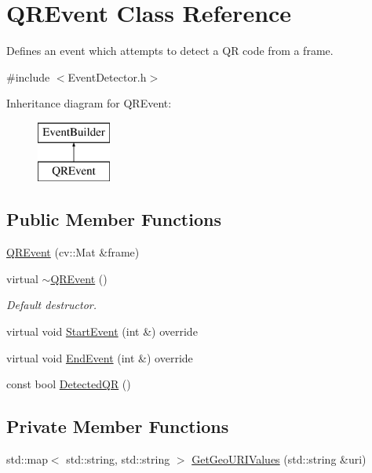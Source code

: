 \hypertarget{class_q_r_event}{}\section{Q\+R\+Event Class Reference}
\label{class_q_r_event}


Defines an event which attempts to detect a QR code from a frame.  




{\ttfamily \#include $<$Event\+Detector.\+h$>$}

Inheritance diagram for Q\+R\+Event\+:\begin{figure}[H]
\begin{center}
\leavevmode
\includegraphics[height=2.000000cm]{class_q_r_event}
\end{center}
\end{figure}
\subsection*{Public Member Functions}
\begin{DoxyCompactItemize}
\item 
\mbox{\hyperlink{class_q_r_event_aacf861110c0a1c3543dee2a6a6aefad1}{Q\+R\+Event}} (cv\+::\+Mat \&frame)
\item 
\mbox{\label{class_q_r_event_a930848ca7d5e1ff15e75abeca5cc90da}} 
virtual \mbox{\hyperlink{class_q_r_event_a930848ca7d5e1ff15e75abeca5cc90da}{$\sim$\+Q\+R\+Event}} ()
\begin{DoxyCompactList}\small\item\em Default destructor. \end{DoxyCompactList}\item 
virtual void \mbox{\hyperlink{class_q_r_event_a1b70ce260e6c326d67f95d7999b76519}{Start\+Event}} (int \&) override
\item 
virtual void \mbox{\hyperlink{class_q_r_event_adb8483f8513c1f3a5021eef1bd55f8c9}{End\+Event}} (int \&) override
\item 
const bool \mbox{\hyperlink{class_q_r_event_acd6618cf30bb95242115eb0c99073c72}{Detected\+QR}} ()
\end{DoxyCompactItemize}
\subsection*{Private Member Functions}
\begin{DoxyCompactItemize}
\item 
std\+::map$<$ std\+::string, std\+::string $>$ \mbox{\hyperlink{class_q_r_event_a06da538bb4051d2d1c0fb62e7ba3e6a8}{Get\+Geo\+U\+R\+I\+Values}} (std\+::string \&uri)
\end{DoxyCompactItemize}
